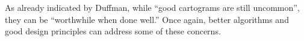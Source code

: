 \documentclass{egpubl}
\begin{document}
As already indicated by Duffman, while ``good cartograms are still uncommon'', they can be ``worthwhile when done well.'' Once again, better algorithms and good design principles can address some of these concerns.

\begin{comment}
\noindent
\textbf{All Maps Lie, and Cartograms Tell Obvious Lies:}

{\color{red} 
There are other criticisms on the projections and implications used in cartograms. David Ruffini on the cartogram of world population~\cite{map_week} (Fig.~\ref{fig:population}) says: 

\hspace{0.01\textwidth}\parbox{0.45\textwidth}{\textit{
`` David Salisbury, a well-respected geographer from the University of Richmond, said, 'all maps are lies and are out-of-date the minute they are published.' Most would hear this statement when seeing a map and be perplexed to why someone would call this scientific document a `lie'. However, in the case of a cartogram, most of these types of maps are distorted in order to show statistical information. A cartogram is defined as a presentation of statistical data in geographical distribution on a map (TheFreeDictionary). Because of this, there is going to be obvious lies throughout the map in order to portray the statistical message it was designed for. Even though the Cartogram of the World's Population is supposed to be an incorrect portrayal of the world, the inaccuracies highlight the disparities in the populations of the world and give readers a different viewpoint of our world.'' }}

 However, he emphasizes that this distortion of a cartogram is intentional and argues the usefulness of cartograms:

\hspace{0.01\textwidth}\parbox{0.45\textwidth}{\textit{
 ``The cartogram is not all bad though. In fact, I would argue that this map has a very distinct usefulness about it. By choosing a cartogram of population, there are positive distortions to small countries with a large amount of people. Take Bangladesh or Ethiopia for example. These are very small countries on a regular map but in a cartogram, its immense population makes it a focal point of the map.  This map makes an argument for some of these small countries with big populations to demand more attention from the world. It's saying that the resources that may be going to the world powers need to be spread out when comparing the populations of 'the little guys' in a traditional map. The cartogram can also open the eyes of certain world powers, especially the US. The cartogram inflates the growing countries around the world especially India and China. This serves as a very important purpose to the US because the ballooning of these particular Asian countries should give us an idea that the relationships with these countries will be changing too as they demand more economic, political and military resources the larger they get.''
}}
}
\end{comment}
\end{document}
